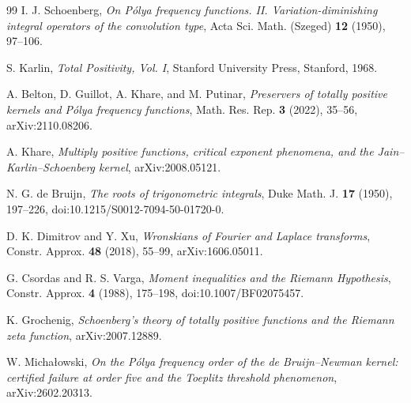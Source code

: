 \clearpage
\begin{thebibliography}{99}
I. J. Schoenberg,
\emph{On P\'olya frequency functions. II. Variation-diminishing integral
operators of the convolution type},
Acta Sci. Math. (Szeged) \textbf{12} (1950), 97--106.

S. Karlin,
\emph{Total Positivity, Vol. I},
Stanford University Press, Stanford, 1968.

A. Belton, D. Guillot, A. Khare, and M. Putinar,
\emph{Preservers of totally positive kernels and P\'olya frequency functions},
Math. Res. Rep. \textbf{3} (2022), 35--56,
arXiv:2110.08206.

A. Khare,
\emph{Multiply positive functions, critical exponent phenomena, and the
Jain--Karlin--Schoenberg kernel},
arXiv:2008.05121.

N. G. de Bruijn,
\emph{The roots of trigonometric integrals},
Duke Math. J. \textbf{17} (1950), 197--226,
doi:10.1215/S0012-7094-50-01720-0.

D. K. Dimitrov and Y. Xu,
\emph{Wronskians of Fourier and Laplace transforms},
Constr. Approx. \textbf{48} (2018), 55--99,
arXiv:1606.05011.

G. Csordas and R. S. Varga,
\emph{Moment inequalities and the Riemann Hypothesis},
Constr. Approx. \textbf{4} (1988), 175--198,
doi:10.1007/BF02075457.

K. Grochenig,
\emph{Schoenberg's theory of totally positive functions and the Riemann zeta
function},
arXiv:2007.12889.

W. Micha\l{}owski,
\emph{On the P\'olya frequency order of the de Bruijn--Newman kernel:
certified failure at order five and the Toeplitz threshold phenomenon},
arXiv:2602.20313.
\end{thebibliography}
